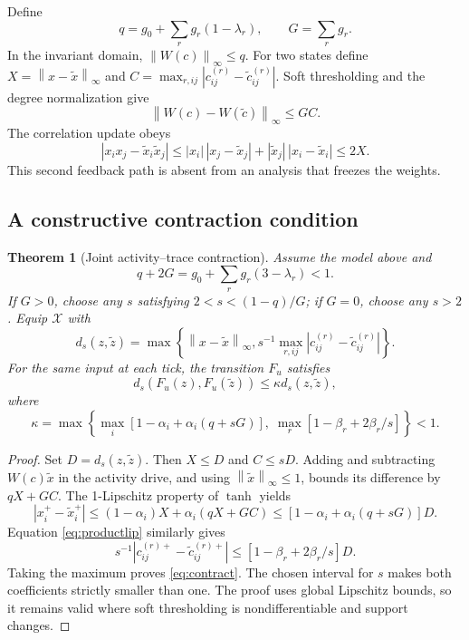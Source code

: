 \documentclass[11pt,a4paper]{article}
\newtheorem{theorem}{Theorem}[section]
\theoremstyle{definition}\newtheorem{definition}[theorem]{Definition}
\newcommand{\norm}[1]{\left\lVert#1\right\rVert}
\newcommand{\state}{\mathcal{X}}
\begin{document}
Define
\begin{equation}
 q=g_0+\sum_r g_r(1-\lambda_r),\qquad G=\sum_r g_r.
 \label{eq:q}
\end{equation}
In the invariant domain, $\norm{W(c)}_\infty\leq q$. For two states define $X=\norm{x-\widetilde x}_\infty$ and $C=\max_{r,ij}|c^{(r)}_{ij}-\widetilde c^{(r)}_{ij}|$. Soft thresholding and the degree normalization give
\begin{equation}
 \norm{W(c)-W(\widetilde c)}_\infty\leq GC. \label{eq:weightlip}
\end{equation}
The correlation update obeys
\begin{equation}
 |x_ix_j-\widetilde x_i\widetilde x_j|
 \leq |x_i|\,|x_j-\widetilde x_j|+|\widetilde x_j|\,|x_i-\widetilde x_i|
 \leq2X. \label{eq:productlip}
\end{equation}
This second feedback path is absent from an analysis that freezes the weights.

\subsection{A constructive contraction condition}
\begin{theorem}[Joint activity--trace contraction]\label{thm:joint}
Assume the model above and
\begin{equation}
 q+2G=g_0+\sum_r g_r(3-\lambda_r)<1. \label{eq:condition}
\end{equation}
If $G>0$, choose any $s$ satisfying $2<s<(1-q)/G$; if $G=0$, choose any $s>2$. Equip $\state$ with
\begin{equation}
 d_s(z,\widetilde z)=\max\left\{\norm{x-\widetilde x}_\infty,
 s^{-1}\max_{r,ij}|c^{(r)}_{ij}-\widetilde c^{(r)}_{ij}|\right\}. \label{eq:metric}
\end{equation}
For the same input at each tick, the transition $F_u$ satisfies
\begin{equation}
 d_s(F_u(z),F_u(\widetilde z))\leq\kappa d_s(z,\widetilde z), \label{eq:contract}
\end{equation}
where
\begin{equation}
 \kappa=\max\left\{\max_i[1-\alpha_i+\alpha_i(q+sG)],\;
 \max_r[1-\beta_r+2\beta_r/s]\right\}<1. \label{eq:kappa}
\end{equation}
\end{theorem}
\begin{proof}
Set $D=d_s(z,\widetilde z)$. Then $X\leq D$ and $C\leq sD$. Adding and subtracting $W(c)\widetilde x$ in the activity drive, and using $\norm{\widetilde x}_\infty\leq1$, bounds its difference by $qX+GC$. The 1-Lipschitz property of $\tanh$ yields
\[
 |x_i^+-\widetilde x_i^+|\leq(1-\alpha_i)X+\alpha_i(qX+GC)
 \leq[1-\alpha_i+\alpha_i(q+sG)]D.
\]
Equation \eqref{eq:productlip} similarly gives
\[
 s^{-1}|c_{ij}^{(r)+}-\widetilde c_{ij}^{(r)+}|
 \leq[1-\beta_r+2\beta_r/s]D.
\]
Taking the maximum proves \eqref{eq:contract}. The chosen interval for $s$ makes both coefficients strictly smaller than one. The proof uses global Lipschitz bounds, so it remains valid where soft thresholding is nondifferentiable and support changes.
\end{proof}
\end{document}
